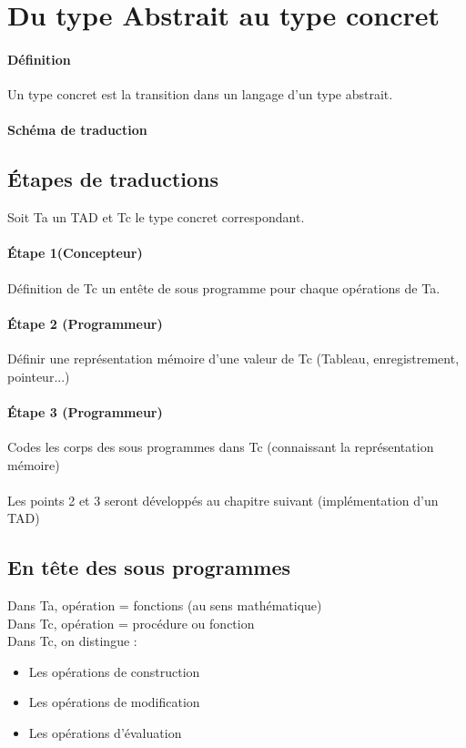 	\section{Du type Abstrait au type concret}
		\paragraph{Définition}
			Un type concret est la transition dans un langage d'un type abstrait.
		\paragraph{Schéma de traduction}
		\subsection{Étapes de traductions}
			Soit Ta un TAD et Tc le type concret correspondant. \\
			\paragraph{Étape 1(Concepteur)}
				Définition de Tc un entête de sous programme pour chaque opérations de Ta.	
			\paragraph{Étape 2 (Programmeur)}
				Définir une représentation mémoire d'une valeur de Tc (Tableau, enregistrement, pointeur...)
			\paragraph{Étape 3 (Programmeur)}
				Codes les corps des sous programmes dans Tc (connaissant la représentation mémoire)
			\paragraph{}
				Les points 2 et 3 seront développés au chapitre suivant (implémentation d'un TAD)	
		\subsection{En tête des sous programmes}
			Dans Ta, opération = fonctions (au sens mathématique)\\
			Dans Tc, opération = procédure ou fonction \\
			Dans Tc, on distingue :
			\begin{itemize}
				\item Les opérations de construction
				\item Les opérations de modification 
				\item Les opérations d'évaluation
			\end{itemize}
